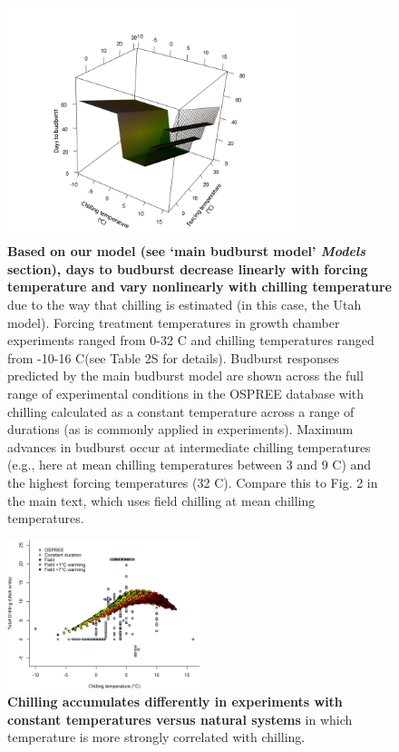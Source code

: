 \documentclass{article}
\begin{document}
\begin{figure}[h!]
\centering
\noindent \includegraphics[width=0.75\textwidth]{..//..//analyses/bb_analysis/figures/bbmod_3dplot_utah.png}
\caption{\textbf{Based on our model (see `main budburst model' \emph{Models} section), days to budburst decrease linearly with forcing temperature and vary nonlinearly with chilling temperature} due to the way that chilling is estimated (in this case, the Utah model). Forcing treatment temperatures in growth chamber experiments ranged from 0-32 \degree C and chilling temperatures ranged from -10-16 \degree C(see Table 2S for details). Budburst responses predicted by the main budburst model are shown across the full range of experimental conditions in the OSPREE database with chilling calculated as a constant temperature across a range of durations (as  is commonly applied in experiments). Maximum advances in budburst occur at intermediate chilling temperatures (e.g., here at mean chilling temperatures between 3 and 9 \degree C) and the highest forcing temperatures (32 \degree C). Compare this to Fig. 2 in the main text, which uses field chilling at mean chilling temperatures.}
\label{fig:3dexpchillutah}
\end{figure}

\begin{figure}[h!]
\centering
\noindent \includegraphics[width=0.50\textwidth]{..//..//analyses/bb_analysis/figures/exp_vs_field_chill_withwarmingcols.png}
\caption{\textbf{Chilling accumulates differently in experiments with constant temperatures versus natural systems} in which temperature is more strongly correlated with chilling.}
\label{fig:chillexpfield}
\end{figure}
\end{document}
